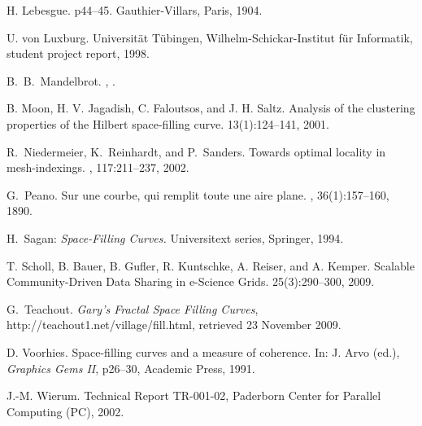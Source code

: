 \documentclass[11pt,a4paper]{article}
\begin{document}
\begin{thebibliography}{10}
H. Lebesgue.
\newblock p44--45. Gauthier-Villars, Paris, 1904.

U. von Luxburg.
\newblock Universit\"at T\"ubingen, Wilhelm-Schickar-Institut f\"ur Informatik, student project report, 1998.

B.~B.~Mandelbrot.
,
.

B. Moon, H. V. Jagadish, C. Faloutsos, and J. H. Saltz.
\newblock Analysis of the clustering properties of the Hilbert space-filling curve.
 13(1):124--141, 2001.

R.~Niedermeier, K.~Reinhardt, and P.~Sanders.
\newblock Towards optimal locality in mesh-indexings.
, 117:211--237, 2002.

G.~Peano.
\newblock Sur une courbe, qui remplit toute une aire plane.
, 36(1):157--160, 1890.

H.~Sagan:
{\em Space-Filling Curves.}
Universitext series, Springer, 1994.

T. Scholl, B. Bauer, B. Gufler, R. Kuntschke, A. Reiser, and A. Kemper.
\newblock Scalable Community-Driven Data Sharing in e-Science Grids.
 25(3):290--300, 2009.

G.~Teachout.
{\em Gary's Fractal Space Filling Curves},
http://teachout1.net/village/fill.html,
retrieved 23 November 2009.

D. Voorhies.
\newblock Space-filling curves and a measure of coherence.
\newblock In: J. Arvo (ed.), {\em Graphics Gems II}, p26--30, Academic Press, 1991.

J.-M. Wierum.
\newblock Technical Report TR-001-02, Paderborn Center for Parallel Computing
  (PC), 2002.

\end{thebibliography}
\end{document}
